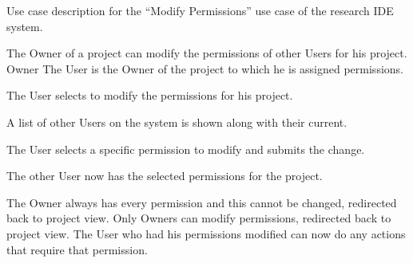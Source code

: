 \begin{table}
  \centering
  \caption{Use case description for the ``Modify Permissions'' use case of the research IDE system.}
  \label{tbl:use-case-modify-permissions}

  \begin{usecase}
    The Owner of a project can modify the permissions of other Users for his project.
    Owner
    The User is the Owner of the project to which he is assigned permissions.
    \ucnormal
    \begin{ucenum}
      \item The User selects to modify the permissions for his project.
      \item A list of other Users on the system is shown along with their current.
      \item The User selects a specific permission to modify and submits the change.
      \item The other User now has the selected permissions for the project.
    \end{ucenum}
    The Owner always has every permission and this cannot be changed, redirected back to project view.
    Only Owners can modify permissions, redirected back to project view.
    The User who had his permissions modified can now do any actions that require that permission.
  \end{usecase}
\end{table}



